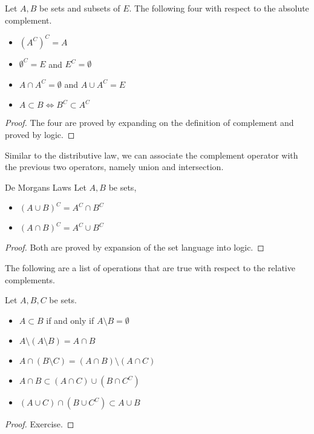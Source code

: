 \documentclass[a4paper]{article}
\begin{document}
\begin{prp}{}{} Let $A,B$ be sets and subsets of $E$. The following four with respect to the absolute complement. 
\begin{itemize}
\item $(A^C)^C=A$
\item $\emptyset^C=E$ and $E^C=\emptyset$
\item $A\cap A^C=\emptyset$ and $A\cup A^C=E$
\item $A\subset B\iff B^C\subset A^C$
\end{itemize}\tcbline
\begin{proof} The four are proved by expanding on the definition of complement and proved by logic. 
\end{proof}
\end{prp}

Similar to the distributive law, we can associate the complement operator with the previous two operators, namely union and intersection. 

\begin{thm}{De Morgans Laws}{} Let $A,B$ be sets, 
\begin{itemize}
\item $(A\cup B)^C=A^C\cap B^C$
\item $(A\cap B)^C=A^C\cup B^C$
\end{itemize}\tcbline
\begin{proof} Both are proved by expansion of the set language into logic. 
\end{proof}
\end{thm}

The following are a list of operations that are true with respect to the relative complements. 

\begin{prp}{}{} Let $A,B,C$ be sets. 
\begin{itemize}
\item $A\subset B$ if and only if $A\setminus B=\emptyset$
\item $A\setminus(A\setminus B)=A\cap B$
\item $A\cap (B\setminus C)=(A\cap B)\setminus(A\cap C)$
\item $A\cap B\subset(A\cap C)\cup(B\cap C^C)$
\item $(A\cup C)\cap(B\cup C^C)\subset A\cup B$
\end{itemize}\tcbline
\begin{proof} Exercise. 
\end{proof}
\end{prp}
\end{document}

